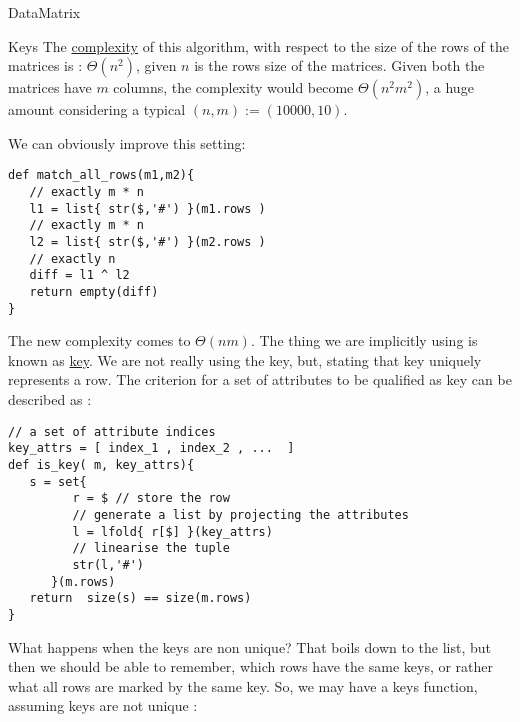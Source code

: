 \begin{section}{DataMatrix}
\begin{subsection}{Keys}
The \href{https://en.wikipedia.org/wiki/Computational\_complexity\_theory}{complexity} of this algorithm, 
with respect to the size of the rows of the matrices is : $\Theta(n^2)$, given $n$ is the rows size of the matrices. 
Given both the matrices have $m$ columns, the complexity would become $\Theta(n^2m^2)$, a huge amount considering
a typical $(n,m) := ( 10000, 10 ) $. 

We can obviously improve this setting: 

\begin{center}\begin{minipage}{\linewidth}
\begin{lstlisting}[style=JexlStyle]
def match_all_rows(m1,m2){
   // exactly m * n 
   l1 = list{ str($,'#') }(m1.rows )
   // exactly m * n
   l2 = list{ str($,'#') }(m2.rows )
   // exactly n
   diff = l1 ^ l2
   return empty(diff)  
}
\end{lstlisting}

The new complexity comes to $\Theta(nm)$.
The thing we are implicitly using is known as \href{https://en.wikipedia.org/wiki/Unique\_key}{key}.
We are not really using the key, but, stating that key uniquely represents a row. The criterion 
for a set of attributes to be qualified as key can be described as : 

\begin{lstlisting}[style=JexlStyle]
// a set of attribute indices 
key_attrs = [ index_1 , index_2 , ...  ]
def is_key( m, key_attrs){
   s = set{  
         r = $ // store the row
         // generate a list by projecting the attributes 
         l = lfold{ r[$] }(key_attrs)
         // linearise the tuple 
         str(l,'#')   
      }(m.rows)
   return  size(s) == size(m.rows)
}
\end{lstlisting}
\end{minipage}\end{center}


What happens when the keys are non unique? That boils down to the list, 
but then we should be able to remember, which rows have the same keys,
or rather what all rows are marked by the same key.
So, we may have a keys function, assuming keys are not unique : 


\end{subsection}
\end{section}
